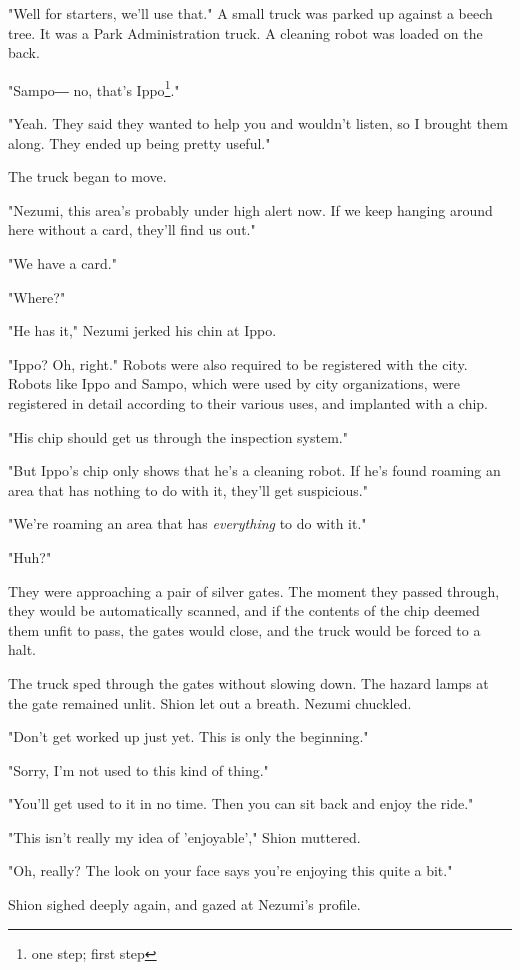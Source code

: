 "Well for starters, we'll use that." A small truck was parked up against
a beech tree. It was a Park Administration truck. A cleaning robot was
loaded on the back.

"Sampo― no, that's Ippo\footnote{one step; first step}."

"Yeah. They said they wanted to help you and wouldn't listen, so I
brought them along. They ended up being pretty useful."

The truck began to move.

"Nezumi, this area's probably under high alert now. If we keep hanging
around here without a card, they'll find us out."

"We have a card."

"Where?"

"He has it," Nezumi jerked his chin at Ippo.

"Ippo? Oh, right." Robots were also required to be registered with the
city. Robots like Ippo and Sampo, which were used by city organizations,
were registered in detail according to their various uses, and implanted
with a chip.

"His chip should get us through the inspection system."

"But Ippo's chip only shows that he's a cleaning robot. If he's found
roaming an area that has nothing to do with it, they'll get suspicious."

"We're roaming an area that has \emph{everything} to do with it."

"Huh?"

They were approaching a pair of silver gates. The moment they passed
through, they would be automatically scanned, and if the contents of the
chip deemed them unfit to pass, the gates would close, and the truck
would be forced to a halt.

The truck sped through the gates without slowing down. The hazard lamps
at the gate remained unlit. Shion let out a breath. Nezumi chuckled.

"Don't get worked up just yet. This is only the beginning."

"Sorry, I'm not used to this kind of thing."

"You'll get used to it in no time. Then you can sit back and enjoy the
ride."

"This isn't really my idea of 'enjoyable'," Shion muttered.

"Oh, really? The look on your face says you're enjoying this quite a
bit."

Shion sighed deeply again, and gazed at Nezumi's profile.


